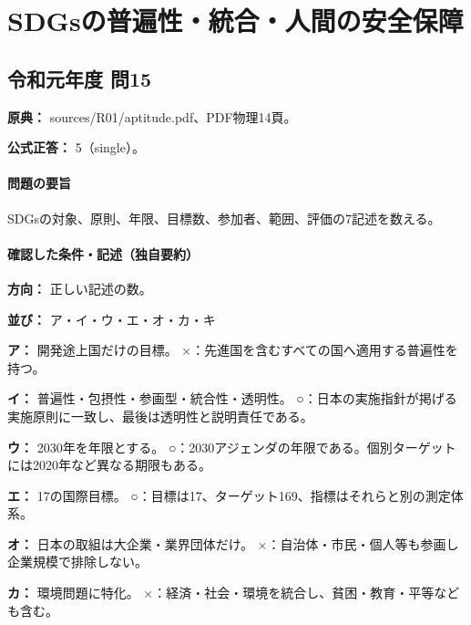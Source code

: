 \section{SDGsの普遍性・統合・人間の安全保障}

\subsection{令和元年度 問15}
\label{q:r01-reg-apt-15}

\noindent\textbf{原典：} sources/R01/aptitude.pdf、PDF物理14頁。

\textbf{公式正答：} 5（single）。

\paragraph{問題の要旨} SDGsの対象、原則、年限、目標数、参加者、範囲、評価の7記述を数える。

\paragraph{確認した条件・記述（独自要約）}\mbox{}\par

\noindent\textbf{方向：} 正しい記述の数。\par

\noindent\textbf{並び：} ア・イ・ウ・エ・オ・カ・キ\par

\noindent\textbf{ア：} 開発途上国だけの目標。 ×：先進国を含むすべての国へ適用する普遍性を持つ。\par

\noindent\textbf{イ：} 普遍性・包摂性・参画型・統合性・透明性。 ○：日本の実施指針が掲げる実施原則に一致し、最後は透明性と説明責任である。\par

\noindent\textbf{ウ：} 2030年を年限とする。 ○：2030アジェンダの年限である。個別ターゲットには2020年など異なる期限もある。\par

\noindent\textbf{エ：} 17の国際目標。 ○：目標は17、ターゲット169、指標はそれらと別の測定体系。\par

\noindent\textbf{オ：} 日本の取組は大企業・業界団体だけ。 ×：自治体・市民・個人等も参画し企業規模で排除しない。\par

\noindent\textbf{カ：} 環境問題に特化。 ×：経済・社会・環境を統合し、貧困・教育・平等なども含む。\par

